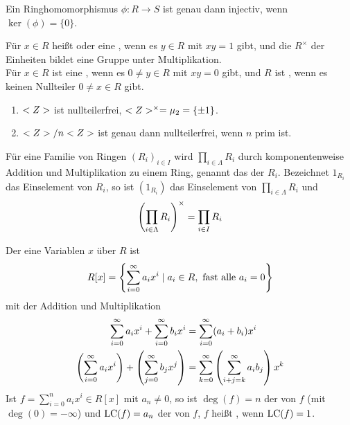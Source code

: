 \begin{proposition}
	Ein Ringhomomorphismus $\phi: R \to S$ ist genau dann injectiv, wenn $\ker(\phi) =\{0\}$.
\end{proposition}

\begin{definition}
	Für $x \in R$ heißt  oder eine , wenn es $y\in R$ mit $xy=1$ gibt, und die $R^{\times}$ der Einheiten bildet eine Gruppe unter Multiplikation.\\
	Für $x \in R$ ist eine , wenn es $0 \neq y \in R$ mit $xy=0$ gibt, und $R$ ist , wenn es keinen Nullteiler $0\neq x \in R$ gibt.
\end{definition}

\begin{example}
	\begin{enumerate}
		\item $<Z>$ ist nullteilerfrei, $<Z>^{\times} = \mu_2 = \{ \pm 1 \}$.
		\item $<Z> / n <Z>$ ist genau dann nullteilerfrei, wenn $n$ prim ist.
	\end{enumerate}
\end{example}

\begin{example}
	Für eine Familie von Ringen $(R_i)_{i \in I}$ wird $\prod_{i \in \Lambda} R_i$ durch komponentenweise Addition und Multiplikation zu einem Ring, genannt das  der $R_i$. Bezeichnet $1_{R_i}$ das Einselement von $R_i$, so ist $(1_{R_i})$ das Einselement von $\prod_{i \in \Lambda} R_i$ und 
	\begin{align}
		\left(\prod_{i\in \Lambda} R_i\right)^{\times} = \prod_{i \in I}R_i \notag
	\end{align}
\end{example}

\begin{example}
	Der  eine Variablen $x$ über $R$ ist 
	\begin{align}
		R[x] = \left\{ \sum_{i=0}^{\infty} a_i x^i \mid a_i \in R, \text{ fast alle } a_i = 0\right\} \notag
	\end{align}
	mit der Addition und Multiplikation
	\begin{align}
		\sum_{i=0}^{\infty} a_i x^i + \sum_{i=0}^{\infty} b_i x^i &= \sum_{i=0}^{\infty} (a_i + b_i) x^i \notag \\
		\left(\sum_{i=0}^{\infty} a_i x^i\right) + \left(\sum_{j=0}^{\infty} b_j x^j\right) &= \sum_{k=0}^{\infty} \left(\sum_{i+j=k}^{\infty} a_i b_j\right) x^k \notag
	\end{align}
	Ist $f = \sum_{i=0}^n a_i x^i \in R[x]$ mit $a_n \neq 0$, so ist $\deg(f) = n$ der  von $f$ (mit $\deg(0) = -\infty$) und $\operatorname{LC}(f) = a_n$ der  von $f$, $f$ heißt , wenn $\operatorname{LC}(f) = 1$.
\end{example}

